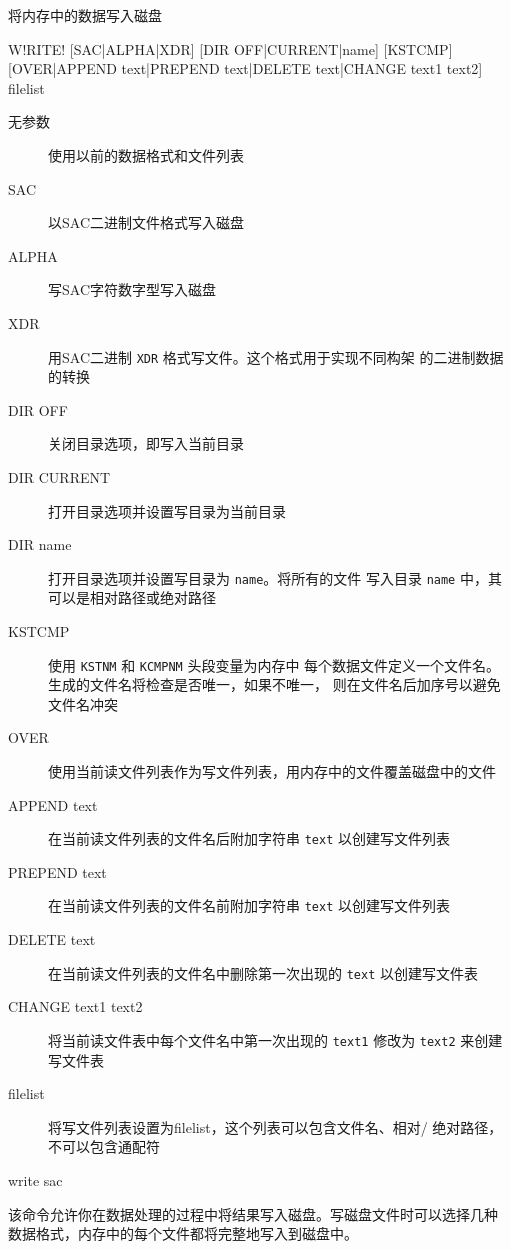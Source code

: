 \label{cmd:write}

将内存中的数据写入磁盘

\begin{SACSTX}
W!RITE! [SAC|ALPHA|XDR] [DIR OFF|CURRENT|name] [KSTCMP]
    [OVER|APPEND text|PREPEND text|DELETE text|CHANGE text1 text2]
    filelist
\end{SACSTX}

\begin{description}
\item [无参数] 使用以前的数据格式和文件列表
\item [SAC] 以SAC二进制文件格式写入磁盘
\item [ALPHA] 写SAC字符数字型写入磁盘
\item [XDR] 用SAC二进制 \texttt{XDR} 格式写文件。这个格式用于实现不同构架
    的二进制数据的转换
\item [DIR OFF] 关闭目录选项，即写入当前目录
\item [DIR CURRENT] 打开目录选项并设置写目录为当前目录
\item [DIR name] 打开目录选项并设置写目录为 \texttt{name}。将所有的文件
    写入目录 \texttt{name} 中，其可以是相对路径或绝对路径
\item [KSTCMP] 使用 \texttt{KSTNM} 和 \texttt{KCMPNM} 头段变量为内存中
    每个数据文件定义一个文件名。生成的文件名将检查是否唯一，如果不唯一，
    则在文件名后加序号以避免文件名冲突
\item [OVER] 使用当前读文件列表作为写文件列表，用内存中的文件覆盖磁盘中的文件
\item [APPEND text] 在当前读文件列表的文件名后附加字符串 \texttt{text}
    以创建写文件列表
\item [PREPEND text] 在当前读文件列表的文件名前附加字符串 \texttt{text}
    以创建写文件列表
\item [DELETE text] 在当前读文件列表的文件名中删除第一次出现的 \texttt{text}
    以创建写文件表
\item [CHANGE text1 text2] 将当前读文件表中每个文件名中第一次出现的 \texttt{text1}
    修改为 \texttt{text2} 来创建写文件表
\item [filelist] 将写文件列表设置为filelist，这个列表可以包含文件名、相对/
    绝对路径，不可以包含通配符
\end{description}

\begin{SACDFT}
write sac
\end{SACDFT}

该命令允许你在数据处理的过程中将结果写入磁盘。写磁盘文件时可以选择几种
数据格式，内存中的每个文件都将完整地写入到磁盘中。

